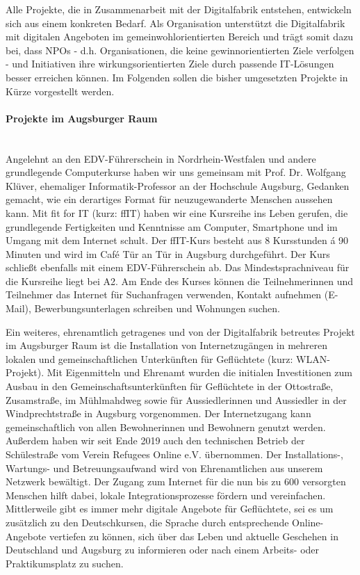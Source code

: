 \documentclass[12pt, a4paper]{article} %
\begin{document}
Alle Projekte, die in Zusammenarbeit mit der Digitalfabrik entstehen,
entwickeln sich aus einem konkreten Bedarf. Als Organisation unterstützt
die Digitalfabrik mit digitalen Angeboten im gemeinwohlorientierten
Bereich und trägt somit dazu bei, dass NPOs - d.h. Organisationen, die
keine gewinnorientierten Ziele verfolgen - und Initiativen ihre
wirkungsorientierten Ziele durch passende IT-Lösungen besser erreichen
können. Im Folgenden sollen die bisher umgesetzten Projekte in Kürze
vorgestellt werden.

\hypertarget{projekte-im-augsburger-raum}{%
\paragraph{\texorpdfstring{Projekte im Augsburger Raum
}{Projekte im Augsburger Raum }}\label{projekte-im-augsburger-raum}}\mbox{} \\

Angelehnt an den EDV-Führerschein in Nordrhein-Westfalen und andere
grundlegende Computerkurse haben wir uns gemeinsam mit Prof. Dr.
Wolfgang Klüver, ehemaliger Informatik-Professor an der Hochschule
Augsburg, Gedanken gemacht, wie ein derartiges Format für
neuzugewanderte Menschen aussehen kann. Mit fit for IT (kurz: ffIT)
haben wir eine Kursreihe ins Leben gerufen, die grundlegende
Fertigkeiten und Kenntnisse am Computer, Smartphone und im Umgang mit
dem Internet schult. Der ffIT-Kurs besteht aus 8 Kursstunden á 90
Minuten und wird im Café Tür an Tür in Augsburg durchgeführt. Der Kurs
schließt ebenfalls mit einem EDV-Führerschein ab. Das
Mindestsprachniveau für die Kursreihe liegt bei A2. Am Ende des Kurses
können die Teilnehmerinnen und Teilnehmer das Internet für Suchanfragen
verwenden, Kontakt aufnehmen (E-Mail), Bewerbungsunterlagen schreiben
und Wohnungen suchen.

Ein weiteres, ehrenamtlich getragenes und von der Digitalfabrik
betreutes Projekt im Augsburger Raum ist die Installation von
Internetzugängen in mehreren lokalen und gemeinschaftlichen Unterkünften
für Geflüchtete (kurz: WLAN-Projekt). Mit Eigenmitteln und Ehrenamt
wurden die initialen Investitionen zum Ausbau in den
Gemeinschaftsunterkünften für Geflüchtete in der Ottostraße,
Zusamstraße, im Mühlmahdweg sowie für Aussiedlerinnen und Aussiedler in
der Windprechtstraße in Augsburg vorgenommen. Der Internetzugang kann
gemeinschaftlich von allen Bewohnerinnen und Bewohnern genutzt werden.
Außerdem haben wir seit Ende 2019 auch den technischen Betrieb der
Schülestraße vom Verein Refugees Online e.V. übernommen. Der
Installations-, Wartungs- und Betreuungsaufwand wird von Ehrenamtlichen
aus unserem Netzwerk bewältigt. Der Zugang zum Internet für die nun bis
zu 600 versorgten Menschen hilft dabei, lokale Integrationsprozesse
fördern und vereinfachen. Mittlerweile gibt es immer mehr digitale
Angebote für Geflüchtete, sei es um zusätzlich zu den Deutschkursen, die
Sprache durch entsprechende Online-Angebote vertiefen zu können, sich
über das Leben und aktuelle Geschehen in Deutschland und Augsburg zu
informieren oder nach einem Arbeits- oder Praktikumsplatz zu suchen.
\end{document}
